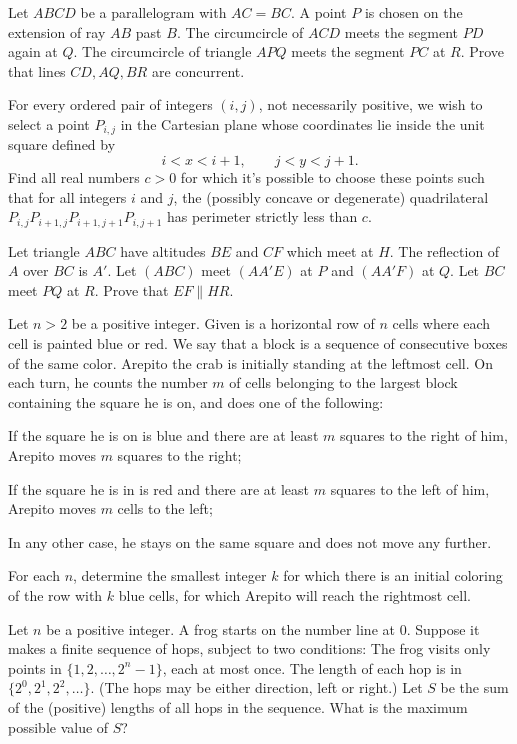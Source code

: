 \documentclass[11pt]{scrartcl}
\begin{document}
\begin{problem}[4389998719836463980]
Let $ABCD$ be a parallelogram with $AC=BC.$ A point $P$ is chosen on the extension of ray $AB$ past $B.$ The circumcircle of $ACD$ meets the segment $PD$ again at $Q.$ The circumcircle of triangle $APQ$ meets the segment $PC$ at $R.$ Prove that lines $CD,AQ,BR$ are concurrent.
\end{problem}
\begin{problem}[8209367948889736949]
For every ordered pair of integers $(i,j)$, not necessarily positive, we wish to select a point $P_{i,j}$ in the Cartesian plane whose coordinates lie inside the unit square defined by
\[ i < x < i+1, \qquad j < y < j+1. \]Find all real numbers $c > 0$ for which it's possible to choose these points such that for all integers $i$ and $j$, the (possibly concave or degenerate) quadrilateral $P_{i,j} P_{i+1,j} P_{i+1,j+1} P_{i,j+1}$ has perimeter strictly less than $c$.
\end{problem}
\begin{problem}[210358073900610]
Let triangle $ABC$ have altitudes $BE$ and $CF$ which meet at $H$. The reflection of $A$ over $BC$ is $A'$. Let $(ABC)$ meet $(AA'E)$ at $P$ and $(AA'F)$ at $Q$. Let $BC$ meet $PQ$ at $R$. Prove that $EF \parallel HR$.
\end{problem}
\begin{problem}[858562234779712]
Let $n> 2$ be a positive integer. Given is a horizontal row of $n$ cells where each cell is painted blue or red. We say that a block is a sequence of consecutive boxes of the same color. Arepito the crab is initially standing at the leftmost cell. On each turn, he counts the number $m$ of cells belonging to the largest block containing the square he is on, and does one of the following:

If the square he is on is blue and there are at least $m$ squares to the right of him, Arepito moves $m$ squares to the right;

If the square he is in is red and there are at least $m$ squares to the left of him, Arepito moves $m$ cells to the left;

In any other case, he stays on the same square and does not move any further.

For each $n$, determine the smallest integer $k$ for which there is an initial coloring of the row with $k$ blue cells, for which Arepito will reach the rightmost cell.
\end{problem}
\begin{problem}[1302548092028853470]
Let $n$ be a positive integer. A frog starts on the number line at $0$. Suppose it makes a finite sequence of hops, subject to two conditions:
The frog visits only points in $\{1, 2, \dots, 2^n-1\}$, each at most once.
The length of each hop is in $\{2^0, 2^1, 2^2, \dots\}$. (The hops may be either direction, left or right.)
Let $S$ be the sum of the (positive) lengths of all hops in the sequence. What is the maximum possible value of $S$?
\end{problem}
\end{document}
